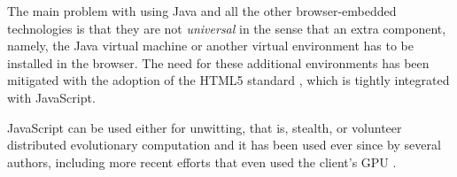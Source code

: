\documentclass{sig-alternate}
\begin{document}
The main problem with using Java and all the other browser-embedded
technologies is that they are not {\em universal} in the
sense that an extra component, namely, the Java virtual machine or another
virtual environment has to be installed in the browser.
The need for
these additional environments has been mitigated with the
adoption of the HTML5 standard \cite{anthes2012html5}, which is
tightly integrated with JavaScript.

JavaScript can be used either for unwitting, that is, stealth,
\cite{unwitting-ec} or volunteer 
\cite{langdon:2005:metas,gecco07:workshop:dcor} distributed
evolutionary computation and it has been used ever since by several
authors, including more recent efforts
\cite{duda2013distributed,DBLP:journals/corr/abs-0801-1210} 
that even
used the client's GPU \cite{duda2013gpu}. 

\end{document}
